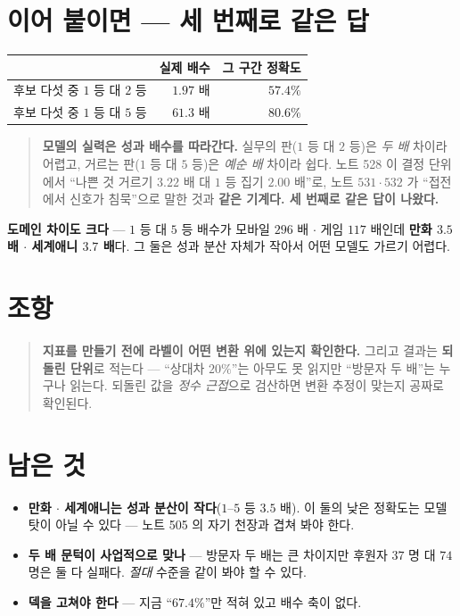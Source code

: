 \documentclass[11pt]{article}
\begin{document}
\section{이어 붙이면 --- 세 번째로 같은 답}

\begin{center}
\begin{tabular}{lrr}
\hline
 & 실제 배수 & 그 구간 정확도 \\
\hline
후보 다섯 중 $1$ 등 대 $2$ 등 & $\mathbf{1.97}$ 배 & $\mathbf{57.4\%}$ \\
후보 다섯 중 $1$ 등 대 $5$ 등 & $61.3$ 배 & $80.6\%$ \\
\hline
\end{tabular}
\end{center}

\begin{quote}
\textbf{모델의 실력은 성과 배수를 따라간다.} 실무의 판($1$ 등 대 $2$ 등)은
\emph{두 배} 차이라 어렵고, 거르는 판($1$ 등 대 $5$ 등)은 \emph{예순 배} 차이라
쉽다. 노트 528 이 결정 단위에서 ``나쁜 것 거르기 $3.22$ 배 대 $1$ 등 집기
$2.00$ 배''로, 노트 $531 \cdot 532$ 가 ``접전에서 신호가 침묵''으로 말한 것과
\textbf{같은 기계다. 세 번째로 같은 답이 나왔다.}
\end{quote}

\textbf{도메인 차이도 크다} --- $1$ 등 대 $5$ 등 배수가 모바일 $296$ 배 $\cdot$
게임 $117$ 배인데 \textbf{만화 $3.5$ 배 $\cdot$ 세계애니 $3.7$ 배}다. 그 둘은
성과 분산 자체가 작아서 어떤 모델도 가르기 어렵다.

\section*{조항}

\begin{quote}
\textbf{지표를 만들기 전에 라벨이 어떤 변환 위에 있는지 확인한다.} 그리고
결과는 \textbf{되돌린 단위}로 적는다 --- ``상대차 $20\%$''는 아무도 못 읽지만
``방문자 두 배''는 누구나 읽는다. 되돌린 값을 \emph{정수 근접}으로 검산하면
변환 추정이 맞는지 공짜로 확인된다.
\end{quote}

\section*{남은 것}

\begin{itemize}
\item \textbf{만화 $\cdot$ 세계애니는 성과 분산이 작다}($1$--$5$ 등 $3.5$ 배).
이 둘의 낮은 정확도는 모델 탓이 아닐 수 있다 --- 노트 505 의 자기 천장과
겹쳐 봐야 한다.
\item \textbf{두 배 문턱이 사업적으로 맞나} --- 방문자 두 배는 큰 차이지만
후원자 $37$ 명 대 $74$ 명은 둘 다 실패다. \emph{절대} 수준을 같이 봐야 할 수
있다.
\item \textbf{덱을 고쳐야 한다} --- 지금 ``$67.4\%$''만 적혀 있고 배수 축이 없다.
\end{itemize}
\end{document}

